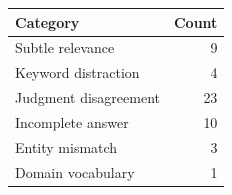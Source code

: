 \begin{tabular}{@{}lr@{}}
\toprule
Category & Count \\
\midrule
Subtle relevance & 9 \\
Keyword distraction & 4 \\
Judgment disagreement & 23 \\
Incomplete answer & 10 \\
Entity mismatch & 3 \\
Domain vocabulary & 1 \\
\bottomrule
\end{tabular}
